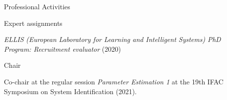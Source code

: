 \documentclass{resume} %
\begin{document}
\begin{rSection}{Professional Activities}



\begin{rSubsection}{Expert assignments}{}{}

\item \hspace{3pt}
{\em ELLIS (European Laboratory for Learning and Intelligent Systems) PhD Program: Recruitment evaluator} (2020)

\end{rSubsection}

\begin{rSubsection}{Chair}{}{}

\item \hspace{3pt} Co-chair at the regular session  \textit{Parameter Estimation 1} at the 19th IFAC Symposium on System Identification (2021).
\end{rSubsection}


\end{rSection}



\end{document}
